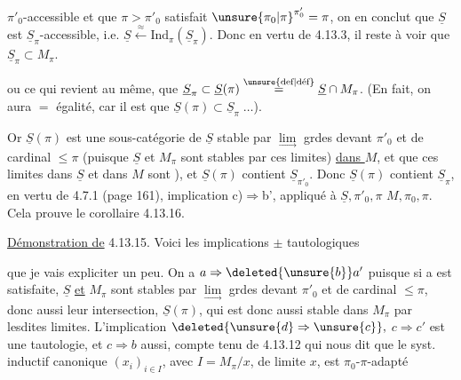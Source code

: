 
$\pi'_0$-accessible et que $\pi>\pi'_0$ satisfait $\unsure{\pi_0|\pi}^{\pi'_0}=\pi$, on en conclut que $\underline S$ est $\underline S_\pi$-accessible, i.e. $\underline S\xleftarrow{\approx}\mathrm{Ind}_\pi(\underline S_\pi)$. Donc en vertu de 4.13.3, il reste à voir que $\underline S_\pi\subset M_\pi$.

 ou ce qui revient au même, que $\underline S_\pi\subset\underline S(\pi)\overset{\text{\unsure{def|déf}}}{=}\underline S\cap M_\pi$. (En fait, on aura $=$ égalité, car il est   que $\underline S(\pi)\subset\underline S_\pi\;\ldots$).

Or $\underline S(\pi)$ est une sous-catégorie de $\underline S$ stable par $\underset{\longrightarrow}{\lim}$ grdes devant $\pi'_0$ et de cardinal $\leq\pi$ (puisque $\underline S$ et $M_\pi$ sont stables par ces limites) \uline{dans $M$}, et que ces limites dans $\underline S$ et dans \uline{$M$} sont ), et $\underline S(\pi)$ contient $\underline S_{\pi'_0}$. Donc $\underline S(\pi)$ contient $\underline S_\pi$, en vertu de 4.7.1 (page 161), implication c)$\Longrightarrow$b', appliqué à $\underline S,\pi'_0,\pi$  $M,\pi_0,\pi$. Cela prouve  le corollaire 4.13.16.

\uline{Démonstration de} 4.13.15. Voici les implications $\pm$ tautologiques



que je vais expliciter un peu. On a $a\Rightarrow\deleted{\unsure{b}}a'$ puisque  si a est satisfaite, $\underline S$ \uline{et} $M_\pi$ sont stables  par $\underset{\longrightarrow}{\lim}$ grdes devant $\pi'_0$ et de cardinal $\leq\pi$, donc aussi leur intersection, $\underline S(\pi)$, qui est donc aussi stable dans $M_\pi$ par lesdites limites.  L'implication $\deleted{\unsure{d}\Rightarrow\unsure{c}},$ $c\Rightarrow c'$  est une tautologie, et $c\Rightarrow b$ aussi, compte tenu de 4.13.12 qui nous dit que le syst. inductif canonique $(x_i)_{i\in I}$, avec $I=M_\pi/x$, de limite $x$, est $\pi_0$-$\pi$-adapté

